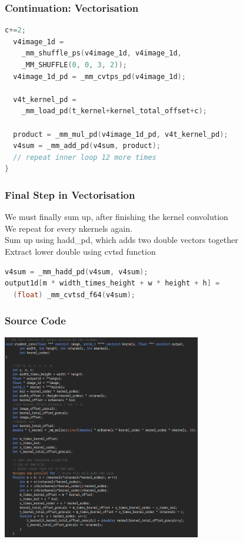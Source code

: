 \documentclass{beamer}
\begin{document}
\begin{frame}[fragile]
\frametitle{Continuation: Vectorisation}
\begin{lstlisting}[language=C,keywordstyle=\color{blue}]
  c+=2;
  v4image_1d = 
    _mm_shuffle_ps(v4image_1d, v4image_1d, 
    _MM_SHUFFLE(0, 0, 3, 2));
  v4image_1d_pd = _mm_cvtps_pd(v4image_1d);

  v4t_kernel_pd = 
    _mm_load_pd(t_kernel+kernel_total_offset+c);

  product = _mm_mul_pd(v4image_1d_pd, v4t_kernel_pd);
  v4sum = _mm_add_pd(v4sum, product);
  // repeat inner loop 12 more times 
}
\end{lstlisting}
\end{frame}

\begin{frame}[fragile]
\frametitle{Final Step in Vectorisation}
We must finally sum up, after finishing the kernel convolution \\
We repeat for every nkernels again. \\
Sum up using hadd\_pd, which adds two double vectors together \\
Extract lower double using cvtsd function
\begin{lstlisting}[language=C,keywordstyle=\color{blue}]
v4sum = _mm_hadd_pd(v4sum, v4sum); 
output1d[m * width_times_height + w * height + h] = 
  (float) _mm_cvtsd_f64(v4sum); 
\end{lstlisting}
\end{frame}

\begin{frame}[fragile]
\frametitle{Source Code}
\includegraphics[width=0.65\textwidth]{images/student-conv-part1}
\end{frame}
\end{document}
